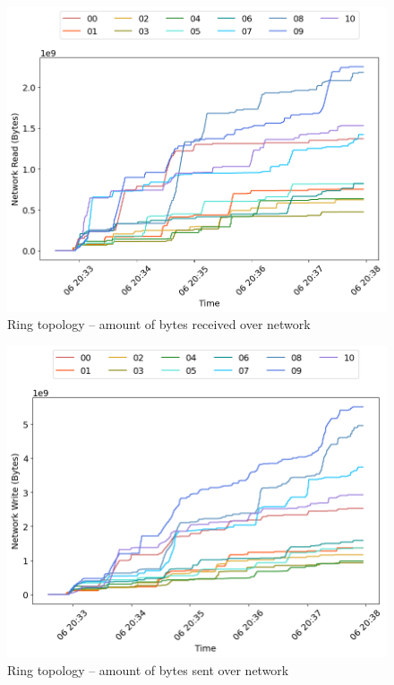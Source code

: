 \begin{minipage}{0.5\linewidth}
\begin{figure}[H]
\captionsetup{justification=centering,width=0.8\linewidth}
\includegraphics[width=\linewidth]{figures/ring/net_read.png}
\caption{Ring topology -- amount of bytes received over network}
\label{fig:ring-net_read}
\end{figure}
\end{minipage}
\begin{minipage}{0.5\linewidth}
\begin{figure}[H]
\captionsetup{justification=centering,width=0.8\linewidth}
\includegraphics[width=\linewidth]{figures/ring/net_write.png}
\caption{Ring topology -- amount of bytes sent over network}
\label{fig:ring-net_write}
\end{figure}
\end{minipage}

